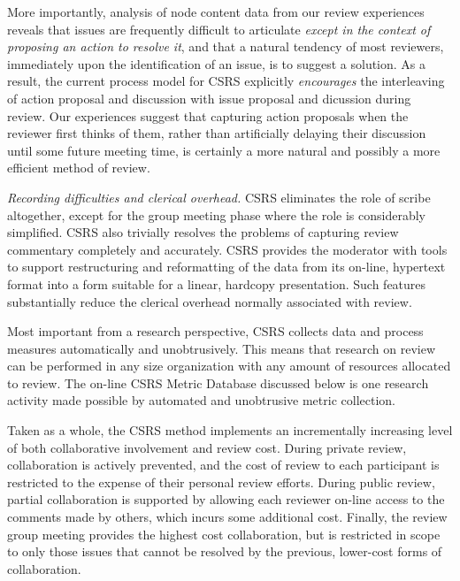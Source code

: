 \begin{itemizenoindent}
  More importantly, analysis of node content data from our review
  experiences reveals that issues are frequently difficult to articulate
  {\em except in the context of proposing an action to resolve it}, and
  that a natural tendency of most reviewers, immediately upon the
  identification of an issue, is to suggest a solution.  As a result, the
  current process model for CSRS explicitly {\em encourages} the
  interleaving of action proposal and discussion with issue proposal and
  dicussion during review.  Our experiences suggest that capturing action
  proposals when the reviewer first thinks of them, rather than
  artificially delaying their discussion until some future meeting time, is
  certainly a more natural and possibly a more efficient method of review.
  
\item {\em Recording difficulties and clerical overhead.} CSRS eliminates
  the role of scribe altogether, except for the group meeting phase where
  the role is considerably simplified.  CSRS also trivially resolves the
  problems of capturing review commentary completely and accurately.  CSRS
  provides the moderator with tools to support restructuring and
  reformatting of the data from its on-line, hypertext format into a form
  suitable for a linear, hardcopy presentation.  Such features
  substantially reduce the clerical overhead normally associated with
  review.
 
  Most important from a research perspective, CSRS collects data and
  process measures automatically and unobtrusively.  This means that
  research on review can be performed in any size organization with any
  amount of resources allocated to review.  The on-line CSRS Metric Database
  discussed below is one research activity made possible by automated and
  unobtrusive metric collection.

\end{itemizenoindent}

Taken as a whole, the CSRS method implements an incrementally increasing
level of both collaborative involvement and review cost.  During private
review, collaboration is actively prevented, and the cost of review to each
participant is restricted to the expense of their personal review efforts.
During public review, partial collaboration is supported by allowing each
reviewer on-line access to the comments made by others, which incurs some
additional cost.  Finally, the review group meeting provides the highest
cost collaboration, but is restricted in scope to only those issues that
cannot be resolved by the previous, lower-cost forms of collaboration.

